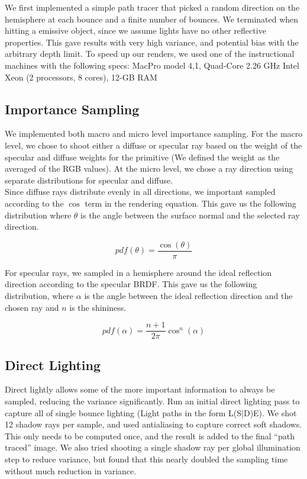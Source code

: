 \documentclass[11pt]{article}
\begin{document}
We first implemented a simple path tracer that picked a random direction on the hemisphere at each bounce and a finite number of bounces. We terminated when hitting a emissive object, since we assume lights have no other reflective properties. This gave results with very high variance, and potential bias with the arbitrary depth limit. To speed up our renders, we used one of the instructional machines with the following specs: MacPro model 4,1, Quad-Core 2.26 GHz Intel Xeon (2 processors, 8 cores), 12-GB RAM

\subsection{Importance Sampling}

We implemented both macro and micro level importance sampling. For the macro level, we chose to shoot either a diffuse or specular ray based on the weight of the specular and diffuse weights for the primitive (We defined the weight as the averaged of the RGB values). At the micro level, we chose a ray direction using separate distributions for specular and diffuse.\\

Since diffuse rays distribute evenly in all directions, we important sampled according to the $\cos$ term in the rendering equation. This gave us the following distribution where $\theta$ is the angle between the surface normal and the selected ray direction.

\begin{equation}
	pdf(\theta) = \frac{\cos(\theta)}{\pi}
\end{equation}

For specular rays, we sampled in a hemisphere around the ideal reflection direction according to the specular BRDF. This gave us the following distribution, where $\alpha$ is the angle between the ideal reflection direction and the chosen ray and $n$ is the shininess.

\begin{equation}
	pdf(\alpha) = \frac{n+1}{2\pi}\cos^{n}(\alpha)
\end{equation}


\subsection{Direct Lighting}
Direct lightly allows some of the more important information to always be sampled, reducing the variance significantly. Run an initial direct lighting pass to capture all of single bounce lighting (Light paths in the form L(S|D)E). We shot 12 shadow rays per sample, and used antialiasing to capture correct soft shadows. This only needs to be computed once, and the result is added to the final ``path traced'' image. We also tried shooting a single shadow ray per global illumination step to reduce variance, but found that this nearly doubled the sampling time without much reduction in variance. 
\end{document}
